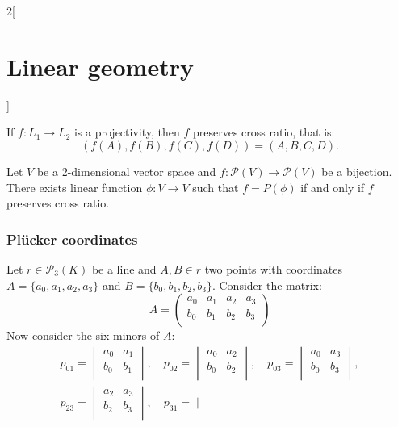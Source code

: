 \documentclass[../../../main.tex]{subfiles}
\begin{document}
\begin{multicols}{2}[\section{Linear geometry}]
\begin{definition}
    \end{definition}
    \begin{theorem}
        If $f:L_1\rightarrow L_2$ is a projectivity, then $f$ preserves cross ratio, that is: $$(f(A),f(B),f(C),f(D))=(A,B,C,D).$$
    \end{theorem}
    \begin{theorem}
        Let $V$ be a 2-dimensional vector space and $f:\mathcal{P}(V)\rightarrow \mathcal{P}(V)$ be a bijection. There exists linear function $\phi:V\rightarrow V$ such that $f=P(\phi)$ if and only if $f$ preserves cross ratio.
    \end{theorem}
    \subsubsection{Plücker coordinates}
    \begin{prop}
        Let $r\in\mathcal{P}_3(K)$ be a line and $A,B\in r$ two points with coordinates $A=\{a_0,a_1,a_2,a_3\}$ and $B=\{b_0,b_1,b_2,b_3\}$. Consider the matrix: $$A=\begin{pmatrix}
                a_0 & a_1 & a_2 & a_3 \\
                b_0 & b_1 & b_2 & b_3 \\
            \end{pmatrix}$$ Now consider the six minors of $A$:
        \begin{gather*}
            p_{01}=\begin{vmatrix}
                a_0 & a_1 \\
                b_0 & b_1 \\
            \end{vmatrix},\quad p_{02}=\begin{vmatrix}
                a_0 & a_2 \\
                b_0 & b_2 \\
            \end{vmatrix},\quad p_{03}=\begin{vmatrix}
                a_0 & a_3 \\
                b_0 & b_3 \\
            \end{vmatrix},\\ p_{23}=\begin{vmatrix}
                a_2 & a_3 \\
                b_2 & b_3 \\
            \end{vmatrix},\quad p_{31}=\begin{vmatrix}

\end{vmatrix}
\end{gather*}
\end{prop}
\end{multicols}
\end{document}
